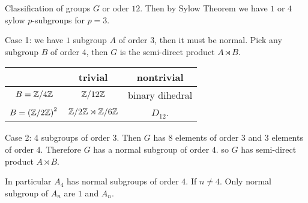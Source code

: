 Classification of groups $G$ or oder $12$. Then by Sylow Theorem we have $1$ or $4$ sylow $p$-subgroups for $p = 3$.

Case 1: we have $1$ subgroup $A$ of order $3$, then it must be normal. Pick any subgroup $B$ of order $4$, then $G$ is the semi-direct product $A \rtimes B$. 
\begin{center}
	\begin{tabular}{c|c|c}
	& trivial & nontrivial \\
	\hline
	$B = \mathbb Z/ 4 \mathbb Z$ & $\mathbb Z/ 12 \mathbb Z $ & binary dihedral \\
	$B = \left( \mathbb Z/ 2 \mathbb Z \right)^2$ & $\mathbb Z/ 2 \mathbb Z \rtimes	\mathbb Z/ 6 \mathbb Z $ & $D_12$.
\end{tabular}
\end{center}	
Case 2: 4 subgroups of order 3. Then $G$ has $8$ elements of order $3$ and $3$ elements of order $4$. Therefore $G$ has a normal subgroup of order $4$. so $G$ has semi-direct product $A \rtimes B$.

\begin{remark}
	In particular $A_4$ has normal subgroups of order $4$. If $n \neq 4$. Only normal subgroup of $A_n$ are $1$ and $A_n$.
\end{remark}

